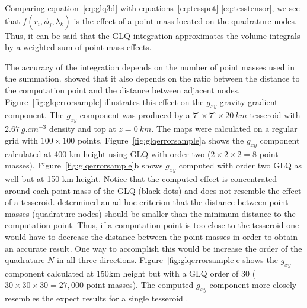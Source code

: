 \documentclass[manuscript,endfloat]{geophysics}
\begin{document}
Comparing equation~\ref{eq:glq3d} with
equations~\ref{eq:tesspot}-\ref{eq:tesstensor},
we see that $f(r_i, \phi_j, \lambda_k)$ is the effect of a point
mass located on the quadrature nodes.
Thus, it can be said that the GLQ integration
approximates the volume integrals  by a
weighted sum of point mass effects.

The accuracy of the integration
depends on the number of point masses used in the summation.
\citet{Ku1977} showed that it also depends on the ratio between
the distance to the computation point and the distance between adjacent nodes.
Figure~\ref{fig:glqerrorsample}
illustrates this effect on the $g_{xy}$ gravity gradient component.
The $g_{xy}$ component was produced by a
$7^\circ \times 7^\circ \times 20\ km$ tesseroid
with $2.67\ g.cm^{-3}$ density
and top at $z=0\ km$.
The maps were calculated on a regular grid
with $100\times100$ points.
Figure~\ref{fig:glqerrorsample}a shows the $g_{xy}$ component
calculated at 400 km height using
GLQ with order two ($2 \times 2 \times 2 = 8$ point masses).
Figure~\ref{fig:glqerrorsample}b shows $g_{xy}$ computed with order two
GLQ as well but at 150 km height.
Notice that the computed effect is concentrated around each point mass
of the GLQ (black dots) and does not resemble the effect of a tesseroid.
\citet{Ku1977} determined an ad hoc criterion that the distance between
point masses (quadrature nodes) should be smaller than the minimum distance to
the computation point.
Thus, if a computation point is too close to the tesseroid one would have to
decrease the distance between the point masses in order to obtain an accurate
result.
One way to accomplish this would be increase the order of the quadrature
$N$ in all three directions.
Figure~\ref{fig:glqerrorsample}c shows the $g_{xy}$ component calculated at
150km height but with a GLQ order of 30
($30 \times 30 \times 30 = 27,000$ point masses).
The computed $g_{xy}$ component more closely resembles
the expect results for a single tesseroid \citep{Asgharzadeh2007}.
\end{document}
